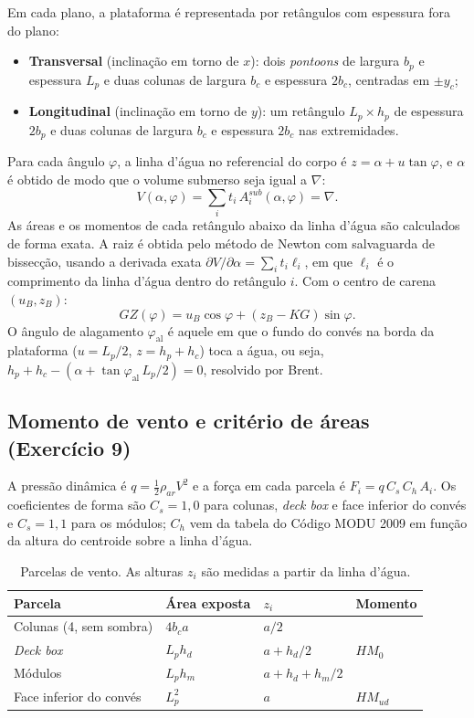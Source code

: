 \documentclass[11pt,a4paper]{article}
\newcommand{\phial}{\varphi_{\mathrm{al}}}
\begin{document}
Em cada plano, a plataforma é representada por retângulos com espessura fora do plano:
\begin{itemize}
\item \textbf{Transversal} (inclinação em torno de $x$): dois \emph{pontoons} de largura $b_p$
e espessura $L_p$ e duas colunas de largura $b_c$ e espessura $2 b_c$, centradas em $\pm y_c$;
\item \textbf{Longitudinal} (inclinação em torno de $y$): um retângulo $L_p \times h_p$ de
espessura $2 b_p$ e duas colunas de largura $b_c$ e espessura $2 b_c$ nas extremidades.
\end{itemize}
Para cada ângulo $\varphi$, a linha d'água no referencial do corpo é $z = \alpha + u\tan\varphi$,
e $\alpha$ é obtido de modo que o volume submerso seja igual a $\nabla$:
\begin{equation}
V(\alpha, \varphi) = \sum_i t_i\, A_i^{sub}(\alpha, \varphi) = \nabla .
\end{equation}
As áreas e os momentos de cada retângulo abaixo da linha d'água são calculados de forma exata.
A raiz é obtida pelo método de Newton com salvaguarda de bissecção, usando a derivada exata
$\partial V/\partial \alpha = \sum_i t_i \ell_i$, em que $\ell_i$ é o comprimento da linha
d'água dentro do retângulo $i$. Com o centro de carena $(u_B, z_B)$:
\begin{equation}
GZ(\varphi) = u_B \cos\varphi + (z_B - KG)\sin\varphi .
\end{equation}
O ângulo de alagamento $\phial$ é aquele em que o fundo do convés na borda da plataforma
($u = L_p/2$, $z = h_p + h_c$) toca a água, ou seja,
$h_p + h_c - (\alpha + \tan\phial \, L_p/2) = 0$, resolvido por Brent.

\subsection{Momento de vento e critério de áreas (Exercício 9)}

A pressão dinâmica é $q = \frac12 \rho_{ar} V^2$ e a força em cada parcela é
$F_i = q\, C_s\, C_h\, A_i$. Os coeficientes de forma são $C_s = 1{,}0$ para colunas,
\emph{deck box} e face inferior do convés e $C_s = 1{,}1$ para os módulos; $C_h$ vem da tabela
do Código MODU 2009 em função da altura do centroide sobre a linha d'água.

\begin{table}[H]
\centering
\caption{Parcelas de vento. As alturas $z_i$ são medidas a partir da linha d'água.}\label{tab:parcelas}
\begin{tabular}{llll}
\toprule
Parcela & Área exposta & $z_i$ & Momento \\
\midrule
Colunas (4, sem sombra) & $4 b_c a$ & $a/2$ & \multirow{3}{*}{$HM_0$} \\
\emph{Deck box} & $L_p h_d$ & $a + h_d/2$ & \\
Módulos & $L_p h_m$ & $a + h_d + h_m/2$ & \\
Face inferior do convés & $L_p^2$ & $a$ & $HM_{ud}$ \\
\bottomrule
\end{tabular}
\end{table}
\end{document}
